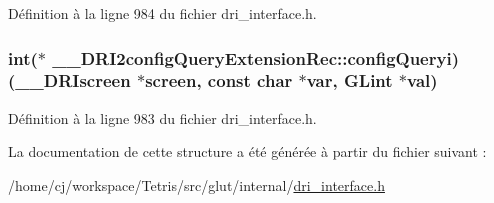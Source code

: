 Définition à la ligne 984 du fichier dri\-\_\-interface.\-h.

\hypertarget{struct_____d_r_i2config_query_extension_rec_a71a4045f75a88a2b648a63b942970414}{
\subsubsection[{config\-Queryi}]{\setlength{\rightskip}{0pt plus 5cm}int($\ast$ \-\_\-\-\_\-\-D\-R\-I2config\-Query\-Extension\-Rec\-::config\-Queryi)({\bf \-\_\-\-\_\-\-D\-R\-Iscreen} $\ast$screen, const char $\ast$var, {\bf G\-Lint} $\ast${\bf val})}}\label{struct_____d_r_i2config_query_extension_rec_a71a4045f75a88a2b648a63b942970414}


Définition à la ligne 983 du fichier dri\-\_\-interface.\-h.



La documentation de cette structure a été générée à partir du fichier suivant \-:\begin{DoxyCompactItemize}
\item 
/home/cj/workspace/\-Tetris/src/glut/internal/\hyperlink{dri__interface_8h}{dri\-\_\-interface.\-h}\end{DoxyCompactItemize}
